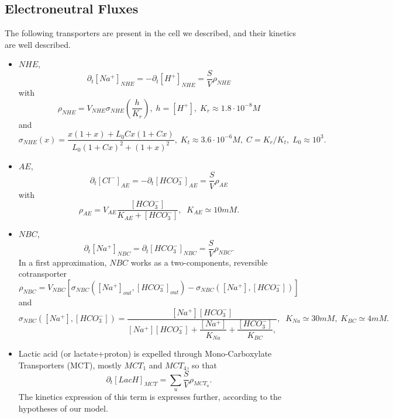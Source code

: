 \documentclass{revtex4}
\begin{document}
\subsection{Electroneutral Fluxes}
The following transporters are present in the cell we described, and their kinetics are well described.
\begin{itemize}
	\item $NHE$, 
	\begin{equation}
	\partial_t \left[Na^+\right]_{NHE} = - \partial_t \left[H^+\right]_{NHE} = \dfrac{S}{V} \rho_{NHE}
	\end{equation}
	with
	\begin{equation}
		\rho_{NHE} = V_{NHE} \sigma_{NHE}\left(\dfrac{h}{K_r}\right), \; h=\left[H^+\right], \;K_r\approx1.8\cdot10^{-8}M
	\end{equation}
	and
	\begin{equation}
		\sigma_{NHE}(x) = \dfrac{
		x(1+x) + L_0 C x(1+Cx)
		}
		{
		L_0 (1+Cx)^2 + (1+x)^2
		}, \; K_t\approx 3.6\cdot10^{-6}M, \; C=K_r/K_t,\;L_0\approx10^3.
	\end{equation}
	\item $AE$,
	\begin{equation}
	\partial_t \left[Cl^-\right]_{AE} = -\partial_t \left[HCO_3^-\right]_{AE} = \dfrac{S}{V} \rho_{AE}
	\end{equation}
	with
	\begin{equation}
	\rho_{AE} = V_{AE} \dfrac{\left[HCO_3^-\right]}{K_{AE} + \left[HCO_3^-\right]},\;\; K_{AE}\simeq10mM.
	\end{equation}
	
	\item $NBC$,
	\begin{equation}
	\partial_t \left[Na^+\right]_{NBC} = \partial_t \left[HCO_3^-\right]_{NBC} = \dfrac{S}{V} \rho_{NBC}.
	\end{equation}
	In a first approximation, $NBC$ works as a two-components, reversible cotransporter
	\begin{equation}
		\rho_{NBC} = V_{NBC}
		 \left[ 
		 	\sigma_{NBC}\left(\left[Na^+\right]_{out},\left[HCO_3^-\right]_{out}\right) 
		  - \sigma_{NBC}\left(\left[Na^+\right],\left[HCO_3^-\right]\right) 
		 \right]
	\end{equation}
	and
	\begin{equation}
	\sigma_{NBC}\left(\left[Na^+\right],\left[HCO_3^-\right]\right) =
	\dfrac{\left[Na^+\right]\left[HCO_3^-\right]}
	{
		\left[Na^+\right]\left[HCO_3^-\right]+\dfrac{\left[Na^+\right]}{K_{Na}}+\dfrac{\left[HCO_3^-\right]}{K_{BC}},
	}, \;\; K_{Na} \simeq 30 mM, \; K_{BC} \simeq  4mM.
	\end{equation}	
		
	\item Lactic acid (or lactate+proton) is expelled through Mono-Carboxylate Transporters (MCT),
	mostly $MCT_1$ and $MCT_4$, so that
	\begin{equation}
	\partial_t \left[LacH\right]_{MCT} = \sum_u \dfrac{S}{V}\rho_{MCT_u}.
	\end{equation}
	The kinetics expression of this term is expresses further, according to the hypotheses of our model.
	
\end{itemize}
\end{document}
